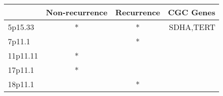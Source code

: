 \begin{tabular}{lccr}
\toprule
{} & Non-recurrence & Recurrence &  CGC Genes \\
\midrule
5p15.33  &              * &          * &  SDHA,TERT \\
7p11.1   &                &          * &            \\
11p11.11 &              * &            &            \\
17p11.1  &              * &            &            \\
18p11.1  &                &          * &            \\
\bottomrule
\end{tabular}

